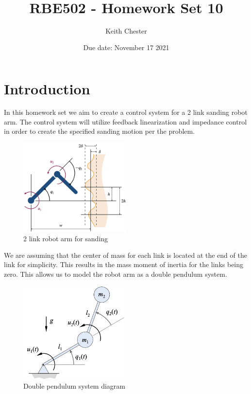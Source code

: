 \documentclass{article}
\title{RBE502 - Homework Set 10}
\author{Keith Chester}
\date{Due date: November 17 2021}
\begin{document}
\maketitle

\section*{Introduction}

In this homework set we aim to create a control system for a 2 link sanding robot arm. The control system will utilize feedback linearization and impedance control in order to create the specified sanding motion per the problem.


\begin{figure}[H]
    \centering
    \includegraphics[width = 0.5\textwidth]{figures/arm_impedance_homework.jpeg}
    \caption{2 link robot arm for sanding}
    \label{fig:arm}
\end{figure}

We are assuming that the center of mass for each link is located at the end of the link for simplicity. This results in the mass moment of inertia for the links being zero. This allows us to model the robot arm as a double pendulum system.

\begin{figure}[H]
    \centering
    \includegraphics[width = 0.5\textwidth]{figures/doublependulum.jpg}
    \caption{Double pendulum system diagram}
    \label{fig:system-diagram}
\end{figure}
\end{document}
